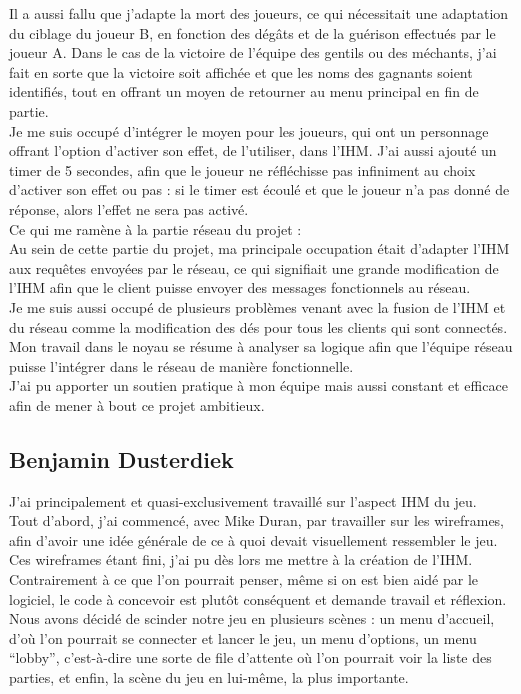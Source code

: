 \documentclass[a4paper,11pt]{article}
\begin{document}
	Il a aussi fallu que j'adapte la mort des joueurs, ce qui nécessitait une adaptation du ciblage du joueur B, en fonction des dégâts et de la guérison effectués par le joueur A.
	Dans le cas de la victoire de l'équipe des gentils ou des méchants, j’ai fait en sorte que la victoire soit affichée et que les noms des gagnants soient identifiés, tout en offrant un moyen de retourner au menu principal en fin de partie. \\
	
    Je me suis occupé d'intégrer le moyen pour les joueurs, qui ont un personnage offrant l'option d’activer son effet, de l’utiliser, dans l’IHM. J’ai aussi ajouté un timer de 5 secondes, afin que le joueur ne réfléchisse pas infiniment au choix d’activer son effet ou pas : si le timer est écoulé et que le joueur n’a pas donné de réponse, alors l’effet ne sera pas activé. \\

	Ce qui me ramène à la partie réseau du projet : \\
	
    Au sein de cette partie du projet, ma principale occupation était d'adapter l'IHM aux requêtes envoyées par le réseau, ce qui signifiait une grande modification de l'IHM afin que le client puisse envoyer des messages fonctionnels au réseau. \\

    Je me suis aussi occupé de plusieurs problèmes venant avec la fusion de l'IHM et du réseau comme la modification des dés pour tous les clients qui sont connectés.
    Mon travail dans le noyau se résume à analyser sa logique afin que l'équipe réseau puisse l'intégrer dans le réseau de manière fonctionnelle. \\

    J'ai pu apporter un soutien pratique à mon équipe mais aussi constant et efficace afin de mener à bout ce projet ambitieux. \\


\subsection{Benjamin Dusterdiek}

	J’ai principalement et quasi-exclusivement travaillé sur l’aspect IHM du jeu. \\

    Tout d’abord, j’ai commencé, avec Mike Duran, par travailler sur les wireframes, afin d’avoir une idée générale de ce à quoi devait visuellement ressembler le jeu. Ces wireframes étant fini, j’ai pu dès lors me mettre à la création de l’IHM. Contrairement à ce que l’on pourrait penser, même si on est bien aidé par le logiciel, le code à concevoir est plutôt conséquent et demande travail et réflexion. Nous avons décidé de scinder notre jeu en plusieurs scènes : un menu d’accueil, d’où l’on pourrait se connecter et lancer le jeu, un menu d’options, un menu “lobby”, c’est-à-dire une sorte de file d’attente où l’on pourrait voir la liste des parties, et enfin, la scène du jeu en lui-même, la plus importante. \\
\end{document}
